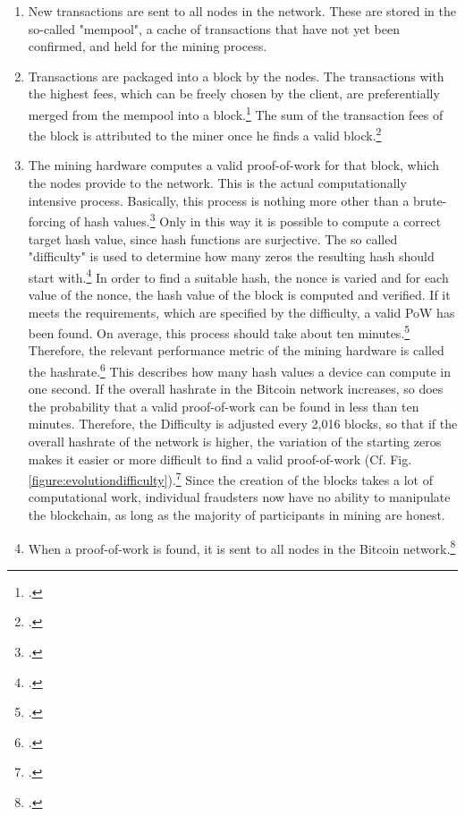 \begin{enumerate}
    \item New transactions are sent to all nodes in the network. These are stored in the so-called "mempool",
    a cache of transactions that have not yet been confirmed, and held for the mining process.
    \item Transactions are packaged into a block by the nodes. The transactions with the highest fees,
    which can be freely chosen by the client, are preferentially merged from the mempool into a block.\footcite[Cf.][p. 53]{bhaskar2015bitcoin}
    The sum of the transaction fees of the block is attributed to the miner
    once he finds a valid block.\footcite[Cf.][p. 4]{nakamoto2008bitcoin}
    \item The mining hardware computes a valid proof-of-work for that block, which the nodes provide to the network.
    This is the actual computationally intensive process. Basically, this process is nothing more
    other than a brute-forcing of hash values.\footcite[Cf.][p. 747]{mukhopadhyay2016brief} Only in this way
    it is possible to compute a correct target hash value, since hash functions are surjective. The so called
    "difficulty" is used to determine how many zeros the resulting hash should start with.\footcite[Cf.][p. 57]{bhaskar2015bitcoin}
    In order to find a suitable hash, the nonce is varied and
    for each value of the nonce, the hash value of the block is computed and verified. If it meets the requirements, which are
    specified by the difficulty, a valid \ac{PoW} has been found. On average, this process should take about ten minutes.\footcite[Cf.][p. 748]{mukhopadhyay2016brief}
    Therefore, the relevant performance metric of the mining hardware is called the
    hashrate.\footcite[Cf.][p. 49]{bhaskar2015bitcoin} This describes how many hash values a device can compute in one second.
    If the overall hashrate in the Bitcoin network increases, so does the
    probability that a valid proof-of-work can be found in less than ten minutes. Therefore, the
    Difficulty is adjusted every 2,016 blocks, so that if the overall hashrate of the network is higher, the variation
    of the starting zeros makes it easier or more difficult to find a valid proof-of-work (Cf.
    Fig. \ref{figure:evolutiondifficulty}).\footcite[Cf.][p. 57]{bhaskar2015bitcoin} Since the creation of the blocks
    takes a lot of computational work, individual fraudsters now have no ability to manipulate the blockchain,
    as long as the majority of participants in mining are honest. 
    \item When a proof-of-work is found, it is sent to all nodes in the Bitcoin network.\footcite[Cf.][pp. 3]{nakamoto2008bitcoin}

\end{enumerate}

